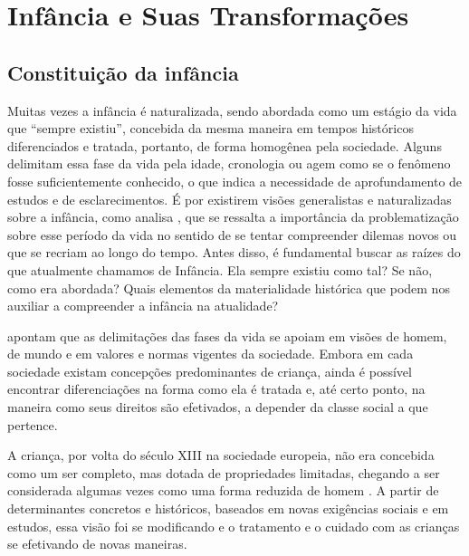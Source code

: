 
\chapter{Infância e Suas Transformações}

\section{Constituição da infância}

Muitas vezes a infância é naturalizada, sendo abordada como um estágio da vida que ``sempre existiu'', concebida da mesma maneira em tempos históricos diferenciados e tratada, portanto, de forma homogênea pela sociedade. Alguns delimitam essa fase da vida pela idade, cronologia ou agem como se o fenômeno fosse suficientemente conhecido, o que indica a necessidade de aprofundamento de estudos e de esclarecimentos. É por existirem visões generalistas e naturalizadas sobre a infância, como analisa , que se ressalta a importância da problematização sobre esse período da vida no sentido de se tentar compreender dilemas novos ou que se recriam ao longo do tempo. Antes disso, é fundamental buscar as raízes do que atualmente chamamos de Infância. Ela sempre existiu como tal? Se não, como era abordada? Quais elementos da materialidade histórica que podem nos auxiliar a compreender a infância na atualidade?

 apontam que as delimitações das fases da vida se apoiam em visões de homem, de mundo e em valores e normas vigentes da sociedade. Embora em cada sociedade existam concepções predominantes de criança, ainda é possível encontrar diferenciações na forma como ela é tratada e, até certo ponto, na maneira como seus direitos são efetivados, a depender da classe social a que pertence.

A criança, por volta do século XIII na sociedade europeia, não era concebida como um ser completo, mas dotada de propriedades limitadas, chegando a ser considerada algumas vezes como uma forma reduzida de homem \cite{ARIES2011}. A partir de determinantes concretos e históricos, baseados em novas exigências sociais e em estudos, essa visão foi se modificando e o tratamento e o cuidado com as crianças se efetivando de novas maneiras. 

